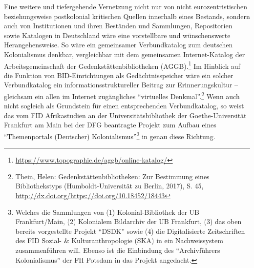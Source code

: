 \documentclass[a4paper,
fontsize=11pt,
oneside,
numbers=noperiodatend,
parskip=half-,
bibliography=totoc,
final
]{scrartcl}
\begin{document}
Eine weitere und tiefergehende Vernetzung nicht nur von nicht
eurozentristischen beziehungsweise postkolonial kritischen Quellen
innerhalb eines Bestands, sondern auch von Institutionen und ihren
Beständen und Sammlungen, Repositorien sowie Katalogen in Deutschland
wäre eine vorstellbare und wünschenswerte Herangehensweise. So wäre ein
gemeinsamer Verbundkatalog zum deutschen Kolonialismus denkbar,
vergleichbar mit dem gemeinsamen Internet-Katalog der
Arbeitsgemeinschaft der Gedenkstättenbibliotheken (AGGB).\footnote{\url{https://www.topographie.de/aggb/online-katalog/}}
Im Hinblick auf die Funktion von BID-Einrichtungen als
Gedächtnisspeicher wäre ein solcher Verbundkatalog ein
informationsstruktureller Beitrag zur Erinnerungskultur -- gleichsam ein
allen im Internet zugängliches \enquote{virtuelles Denkmal}.\footnote{Thein,
  Helen: Gedenkstättenbibliotheken: Zur Bestimmung eines Bibliothekstyps
  (Humboldt-Universität zu Berlin, 2017), S. 45,
  \url{http://dx.doi.org/https://doi.org/10.18452/18443}} Wenn auch
nicht sogleich als Grundstein für einen entsprechenden Verbundkatalog,
so weist das vom FID Afrikastudien an der Universitätsbibliothek der
Goethe-Universität Frankfurt am Main bei der DFG beantragte Projekt zum
Aufbau eines \enquote{Themenportals (Deutscher)
Kolonialismus}\footnote{Welches die Sammlungen von (1)
  Kolonial-Bibliothek der UB Frankfurt/Main, (2) Kolonialem Bildarchiv
  der UB Frankfurt, (3) das oben bereits vorgestellte Projekt
  \enquote{DSDK} sowie (4) die Digitalisierte Zeitschriften des FID
  Sozial- \& Kulturanthropologie (SKA) in ein Nachweissystem
  zusammenführen will. Ebenso ist die Einbindung des
  \enquote{Archivführers Kolonialismus} der FH Potsdam in das Projekt
  angedacht.} in genau diese Richtung.
\end{document}

